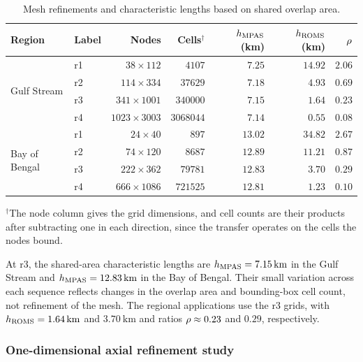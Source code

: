 \begin{table}[htbp]
\centering
\small
\setlength{\tabcolsep}{3pt}
\caption{Mesh refinements and characteristic lengths based on shared overlap area.}
\label{conv:tab:grid-inventory}
\begin{tabular}{llrrrrr}
\toprule
Region & Label & Nodes & Cells$^{\dagger}$ & $h_{\mathrm{MPAS}}$ (km) & $h_{\mathrm{ROMS}}$ (km) & $\rho$ \\
\midrule
\multirow{4}{*}{Gulf Stream} & r1 & $38\times112$ & $4107$ & $7.25$ & $14.92$ & $2.06$ \\
& r2 & $114\times334$ & $37629$ & $7.18$ & $4.93$ & $0.69$ \\
& r3 & $341\times1001$ & $340000$ & $7.15$ & $1.64$ & $0.23$ \\
& r4 & $1023\times3003$ & $3068044$ & $7.14$ & $0.55$ & $0.08$ \\
\midrule
\multirow{4}{*}{Bay of Bengal} & r1 & $24\times40$ & $897$ & $13.02$ & $34.82$ & $2.67$ \\
& r2 & $74\times120$ & $8687$ & $12.89$ & $11.21$ & $0.87$ \\
& r3 & $222\times362$ & $79781$ & $12.83$ & $3.70$ & $0.29$ \\
& r4 & $666\times1086$ & $721525$ & $12.81$ & $1.23$ & $0.10$ \\
\bottomrule
\end{tabular}

\vspace{0.3em}
{\footnotesize $^{\dagger}$The node column gives the \ROMS grid dimensions, and cell counts are their products after subtracting one in each direction, since the transfer operates on the cells the nodes bound.}
\end{table}

At r3, the shared-area \MPAS characteristic lengths are $h_{\mathrm{MPAS}}=\SI{7.15}{\kilo\metre}$ in the Gulf Stream and $h_{\mathrm{MPAS}}=\SI{12.83}{\kilo\metre}$ in the Bay of Bengal. Their small variation across each sequence reflects changes in the overlap area and bounding-box cell count, not refinement of the \MPAS mesh. The regional applications use the r3 \ROMS grids, with $h_{\mathrm{ROMS}}=\SI{1.64}{\kilo\metre}$ and $\SI{3.70}{\kilo\metre}$ and ratios $\rho\approx0.23$ and $0.29$, respectively.



\subsubsection{One-dimensional axial refinement study}\label{conv:sec:axial-refinement}

